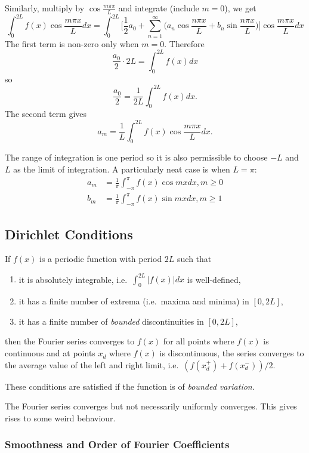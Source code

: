 \documentclass[a4paper]{article}
\begin{document}
Similarly, multiply by $\cos \frac{m\pi x}{L}$ and integrate (include $m=0$), we get
\[
  \int_0^{2L} f(x)\cos\frac{m\pi x}{L} dx = \int_0^{2L} \Bigg[ \frac{1}{2}a_0 + \sum_{n=1}^\infty \Big(a_n\cos\frac{n\pi x}{L} +b_n\sin\frac{n\pi x}{L}\Big) \Bigg] \cos\frac{m\pi x}{L} dx
\]
The first term is non-zero only when $m=0$. Therefore
\[
  \frac{a_0}{2} \cdot 2L = \int_0^{2L} f(x) dx
\]
so
\[
\frac{a_0}{2} = \frac{1}{2L}\int_0^{2L} f(x) dx.
\]
The second term gives
\[
  a_m = \frac{1}{L} \int_0^{2L} f(x) \cos\frac{m\pi x}{L} dx.
\]

The range of integration is one period so it is also permissible to choose $-L$ and $L$ as the limit of integration. A particularly neat case is when $L=\pi$:
\begin{align*}
  a_m &= \frac{1}{\pi} \int_{-\pi}^\pi f(x) \cos mx dx, m\geq0 \\
  b_m &= \frac{1}{\pi} \int_{-\pi}^\pi f(x) \sin mx dx, m\geq1
\end{align*}

\subsection{Dirichlet Conditions}

If $f(x)$ is a periodic function with period $2L$ such that
\begin{enumerate}
\item it is absolutely integrable, i.e.\ $\int_0^{2L}|f(x)| dx$ is well-defined,
\item it has a finite number of extrema (i.e.\ maxima and minima) in $[0,2L]$,
  \item it has a finite number of \emph{bounded} discontinuities in $[0,2L]$,
\end{enumerate}
then the Fourier series converges to $f(x)$ for all points where $f(x)$ is continuous and at points $x_d$ where $f(x)$ is discontinuous, the series converges to the average value of the left and right limit, i.e.\ $(f(x_d^+)+f(x_d^-))/2$.

These conditions are satisfied if the function is of \emph{bounded variation}.

\begin{rmk}
  The Fourier series converges but not necessarily uniformly converges. This gives rises to some weird behaviour.
\end{rmk}

\subsubsection{Smoothness and Order of Fourier Coefficients}
\end{document}
